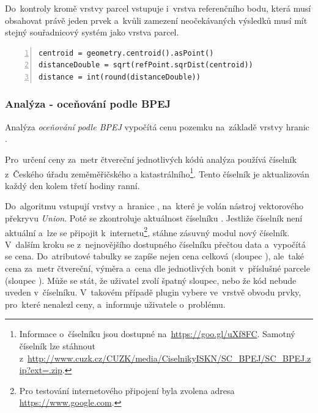 Do~kontroly kromě vrstvy parcel vstupuje i~vrstva referenčního bodu, která musí obsahovat právě jeden prvek a~kvůli zamezení neočekávaných výsledků musí mít stejný souřadnicový systém jako vrstva parcel.

{\scriptsize
\begin{lstlisting}[style=python, caption={Analýza \textit{měření vzdálenosti}~– výpočet vzdálenosti těžiště\newline od~referenčního bodu}, captionpos=b, label=analyza_vzdalenost_vypocet_vzdalenosti_teziste_od_ref_bodu, backgroundcolor = \color{light-gray},  numbers=left]
centroid = geometry.centroid().asPoint()
distanceDouble = sqrt(refPoint.sqrDist(centroid))
distance = int(round(distanceDouble))
\end{lstlisting}}

\subsubsection{Analýza - oceňování podle BPEJ}
\label{analyza_bpej}

Analýza \textit{oceňování podle BPEJ} vypočítá cenu pozemku na~základě vrstvy hranic .

Pro~určení ceny za~metr čtvereční jednotlivých kódů  analýza používá číselník  z~Českého úřadu zeměměřičského a katastrálního\footnote{Informace o~číselníku jsou dostupné na~\url{https://goo.gl/uXf8FC}. Samotný číselník lze stáhnout z~\url{http://www.cuzk.cz/CUZK/media/CiselnikyISKN/SC_BPEJ/SC_BPEJ.zip?ext=.zip}.}. Tento číselník je aktualizován každý den kolem třetí hodiny ranní.

Do~algoritmu vstupují vrstvy \texttt{} a~hranice , na~které je volán nástroj vektorového překryvu \textit{Union}. Poté se zkontroluje aktuálnost číselníku . Jestliže číselník není aktuální a~lze se připojit k~internetu\footnote{Pro testování internetového připojení byla zvolena adresa \url{https://www.google.com}.}, stáhne zásuvný modul nový číselník. V~dalším kroku se z~nejnovějšího dostupného číselníku přečtou data a~vypočítá se cena. Do~atributové tabulky se zapíše nejen cena celková (sloupec \texttt{}), ale~také cena za~metr čtvereční, výměra a~cena dle jednotlivých bonit v~příslušné parcele (sloupec \texttt{}). Může se stát, že uživatel zvolí špatný sloupec, nebo že kód  nebude uveden v~číselníku. V~takovém případě plugin vybere ve~vrstvě obvodu prvky, pro~které nenalezl ceny, a~informuje uživatele o~problému.

